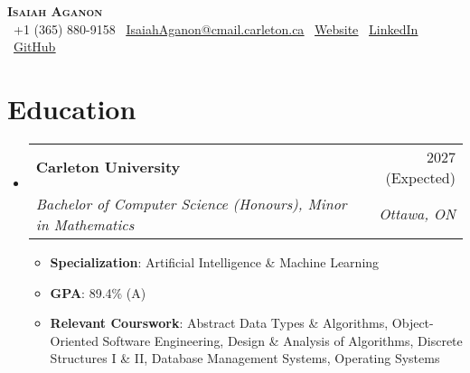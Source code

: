 \documentclass[letterpaper,11pt]{article}
\makeatletter
\newcommand{\resumeItem}[1]{
  \item\small{
    {#1 \vspace{-2pt}}
  }
}
\newcommand{\resumeSubheading}[4]{
  \vspace{-2pt}\item
    \begin{tabular*}{0.97\textwidth}[t]{l@{\extracolsep{\fill}}r}
      \textbf{#1} & #2 \\
      \textit{\small#3} & \textit{\small #4} \\
    \end{tabular*}\vspace{-7pt}
}
\newcommand{\resumeSubHeadingListStart}{\begin{itemize}[leftmargin=0.15in, label={}]}
\newcommand{\resumeSubHeadingListEnd}{\end{itemize}}
\newcommand{\resumeItemListStart}{\begin{itemize}}
\newcommand{\resumeItemListEnd}{\end{itemize}\vspace{-5pt}}
\makeatother
\begin{document}

\begin{center}
  \textbf{\Huge \scshape Isaiah Aganon} \\ \vspace{1pt}
  \small
  \faPhone\ +1 (365) 880-9158  
  \hspace{5pt}
  \faEnvelope\ \href{mailto:IsaiahAganon@cmail.carleton.ca?subject=Re:%20Internship%20Application%20Status&body=Hello%20Isaiah,}{\uline{IsaiahAganon@cmail.carleton.ca}} 
  \hspace{5pt}
  \faGlobe\ \href{https://webpage-aganonisaiahs-projects.vercel.app/}{\uline{Website}}
  \hspace{5pt}
  \faLinkedin\ \href{https://www.linkedin.com/in/isaiah-aganon-888b892a8/}{\uline{LinkedIn}}
  \hspace{5pt}
  \faGithub\ \href{https://github.com/AganonIsaiah}{\uline{GitHub}}
\end{center}


\section{Education}
\resumeSubHeadingListStart
    \resumeSubheading
      {Carleton University}{2027 (Expected)}
      {Bachelor of Computer Science (Honours), Minor in Mathematics}{Ottawa, ON}
      \resumeItemListStart
        \resumeItem{{\bf Specialization}: Artificial Intelligence \& Machine Learning}
        \resumeItem{{\bf GPA}: 89.4\% (A)}
       \resumeItem{{\bf Relevant Courswork}: Abstract Data Types \& Algorithms, Object-Oriented Software Engineering, Design \& Analysis of Algorithms, Discrete Structures I \& II, Database Management Systems, Operating Systems}
      \resumeItemListEnd
\resumeSubHeadingListEnd
\end{document}
